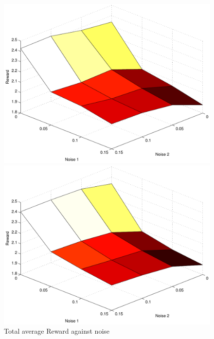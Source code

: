 \begin{figure}[h]
	\caption{Total average Reward against noise}
	\label{pic player asdf}
\begin{minipage}[hbt]{0.65\textwidth}
	\centering
	\includegraphics[width=\textwidth]{pics/simulation1/Total_Reward_vs_Noise}
\end{minipage}
\hfill
\begin{minipage}[hbt]{0.3\textwidth}
	\centering
	\includegraphics[width=\textwidth]{pics/simulation2/Total_Reward_vs_Noise}
\end{minipage}

\end{figure}


